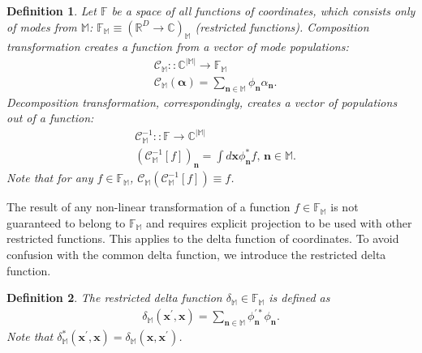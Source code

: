 \documentclass[12pt,aip,jmp,amssymb,amsmath]{revtex4-1}
\newcommand{\nvec}{\boldsymbol{n}}
\newcommand{\xvec}{\boldsymbol{x}}
\newcommand{\balpha}{\boldsymbol{\alpha}}
\newcommand{\restbasis}{\mathbb{M}}
\newtheorem{definition}{Definition}
\begin{document}
\begin{definition}
    Let $\mathbb{F}$ be a space of all functions of coordinates, which consists only of modes from $\restbasis$: $\mathbb{F}_{\restbasis} \equiv (\mathbb{R}^D \rightarrow \mathbb{C})_{\restbasis}$ (restricted functions).
    Composition transformation creates a function from a vector of mode populations:
    \begin{equation*}\begin{split}
        & \mathcal{C}_{\restbasis} :: \mathbb{C}^{|\restbasis|} \rightarrow \mathbb{F}_{\restbasis} \\
        & \mathcal{C}_{\restbasis}(\balpha) = \sum_{\nvec \in \restbasis} \phi_{\nvec} \alpha_{\nvec}.
    \end{split}\end{equation*}
    Decomposition transformation, correspondingly, creates a vector of populations out of a function:
    \begin{equation*}\begin{split}
        & \mathcal{C}_{\restbasis}^{-1} :: \mathbb{F} \rightarrow \mathbb{C}^{|\restbasis|} \\
        & (\mathcal{C}_{\restbasis}^{-1}[f])_{\nvec}
        = \int d\xvec \phi_{\nvec}^* f,\,{\nvec} \in \restbasis.
    \end{split}\end{equation*}
    Note that for any $f \in \mathbb{F}_{\restbasis}$, $\mathcal{C}_{\restbasis}(\mathcal{C}_{\restbasis}^{-1}[f]) \equiv f$.
\end{definition}

The result of any non-linear transformation of a function $f \in \mathbb{F}_{\restbasis}$ is not guaranteed to belong to $\mathbb{F}_{\restbasis}$ and requires explicit projection to be used with other restricted functions.
This applies to the delta function of coordinates.
To avoid confusion with the common delta function, we introduce the restricted delta function.

\begin{definition}
\label{def:func-calculus:restricted-delta}
    The restricted delta function $\delta_{\restbasis} \in \mathbb{F}_{\restbasis}$ is defined as
    \begin{equation*}\begin{split}
        \delta_{\restbasis}(\xvec^\prime, \xvec)
        = \sum_{\nvec \in \restbasis} \phi_{\nvec}^{\prime*} \phi_{\nvec}.
    \end{split}\end{equation*}
    Note that $\delta_{\restbasis}^*(\xvec^\prime, \xvec) = \delta_{\restbasis}(\xvec, \xvec^\prime)$.
\end{definition}
\end{document}
